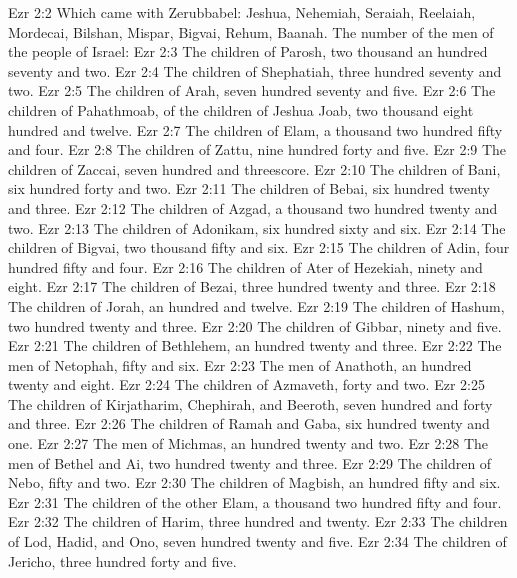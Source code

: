 \vs Ezr 2:2 Which came with Zerubbabel: Jeshua, Nehemiah, Seraiah, Reelaiah, Mordecai, Bilshan, Mispar, Bigvai, Rehum, Baanah. The number of the men of the people of Israel:
\vs Ezr 2:3 The children of Parosh, two thousand an hundred seventy and two.
\vs Ezr 2:4 The children of Shephatiah, three hundred seventy and two.
\vs Ezr 2:5 The children of Arah, seven hundred seventy and five.
\vs Ezr 2:6 The children of Pahathmoab, of the children of Jeshua  Joab, two thousand eight hundred and twelve.
\vs Ezr 2:7 The children of Elam, a thousand two hundred fifty and four.
\vs Ezr 2:8 The children of Zattu, nine hundred forty and five.
\vs Ezr 2:9 The children of Zaccai, seven hundred and threescore.
\vs Ezr 2:10 The children of Bani, six hundred forty and two.
\vs Ezr 2:11 The children of Bebai, six hundred twenty and three.
\vs Ezr 2:12 The children of Azgad, a thousand two hundred twenty and two.
\vs Ezr 2:13 The children of Adonikam, six hundred sixty and six.
\vs Ezr 2:14 The children of Bigvai, two thousand fifty and six.
\vs Ezr 2:15 The children of Adin, four hundred fifty and four.
\vs Ezr 2:16 The children of Ater of Hezekiah, ninety and eight.
\vs Ezr 2:17 The children of Bezai, three hundred twenty and three.
\vs Ezr 2:18 The children of Jorah, an hundred and twelve.
\vs Ezr 2:19 The children of Hashum, two hundred twenty and three.
\vs Ezr 2:20 The children of Gibbar, ninety and five.
\vs Ezr 2:21 The children of Bethlehem, an hundred twenty and three.
\vs Ezr 2:22 The men of Netophah, fifty and six.
\vs Ezr 2:23 The men of Anathoth, an hundred twenty and eight.
\vs Ezr 2:24 The children of Azmaveth, forty and two.
\vs Ezr 2:25 The children of Kirjatharim, Chephirah, and Beeroth, seven hundred and forty and three.
\vs Ezr 2:26 The children of Ramah and Gaba, six hundred twenty and one.
\vs Ezr 2:27 The men of Michmas, an hundred twenty and two.
\vs Ezr 2:28 The men of Bethel and Ai, two hundred twenty and three.
\vs Ezr 2:29 The children of Nebo, fifty and two.
\vs Ezr 2:30 The children of Magbish, an hundred fifty and six.
\vs Ezr 2:31 The children of the other Elam, a thousand two hundred fifty and four.
\vs Ezr 2:32 The children of Harim, three hundred and twenty.
\vs Ezr 2:33 The children of Lod, Hadid, and Ono, seven hundred twenty and five.
\vs Ezr 2:34 The children of Jericho, three hundred forty and five.
